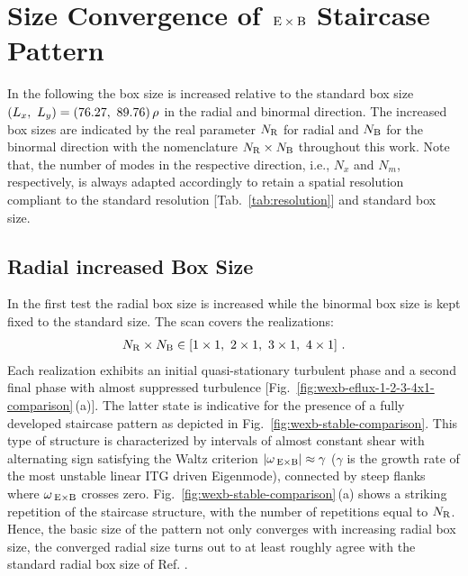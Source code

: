
\newpage
\section{Size Convergence of $\mathrm{\:E}\times\mathrm{B}$ Staircase Pattern}
\label{sec:convergence}

In the following the box size is increased relative to the standard box size $(L_x,~L_y) = (76.27,~89.76)\,\rho$ in the radial and binormal direction. The increased box sizes are indicated by the real parameter $N_\mathrm{R}$ for radial and $N_\mathrm{B}$ for the binormal direction with the nomenclature $N_\mathrm{R}\times N_\mathrm{B}$ throughout this work. 
Note that, the number of modes in the respective direction, i.e., $N_x$ and $N_m$, respectively, is always adapted accordingly to retain a spatial resolution compliant to the standard resolution [Tab.~\ref{tab:resolution}] and standard box size. \\

\subsection{Radial increased Box Size}
\label{sub:radial}

In the first test the radial box size is increased while the binormal box size is kept fixed to the standard size. The scan covers the realizations: 
\begin{gather*}
	N_\mathrm{R} \times N_\mathrm{B} \in [1\times1,~2\times1,~3\times1,~4\times1]~.
\end{gather*}
Each realization exhibits an initial quasi-stationary turbulent phase and a second final \cite{Peeters2016} phase with almost suppressed turbulence [Fig.~\ref{fig:wexb-eflux-1-2-3-4x1-comparison}\,(a)].
The latter state is indicative for the presence of a fully developed staircase pattern as depicted in Fig.~\ref{fig:wexb-stable-comparison}. 
This type of structure is characterized by intervals of almost constant shear with alternating sign satisfying the Waltz criterion $|\omega_{\mathrm{\:E \times B}}| \approx \gamma$\cite{Waltz1994, Waltz1998} ($\gamma$ is the growth rate of the most unstable linear ITG driven Eigenmode), connected by steep flanks where $\omega_{\mathrm{\:E \times B}}$ crosses zero.
Fig.~\ref{fig:wexb-stable-comparison}\,(a) shows a striking repetition of the staircase structure, with the number of repetitions equal to $N_\mathrm{R}$.
Hence, the basic size of the pattern not only converges with increasing radial box size, the converged radial size turns out to at least roughly agree with the standard radial box size of Ref. . \bigskip

